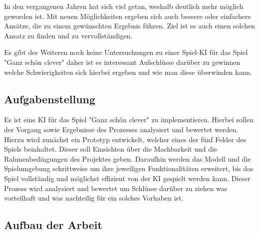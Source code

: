 In den vergangenen Jahren hat sich viel getan, weshalb deutlich mehr möglich geworden ist. Mit neuen Möglichkeiten ergeben sich auch bessere oder einfachere Ansätze, die zu einem gewünschten Ergebnis führen. Ziel ist es auch einen solchen Ansatz zu finden und zu vervollständigen.

Es gibt des Weiteren noch keine Untersuchungen zu einer Spiel-KI für das Spiel "Ganz schön clever" daher ist es interessant Aufschlüsse darüber zu gewinnen welche Schwierigkeiten sich hierbei ergeben und wie man diese überwinden kann.
\subsection{Aufgabenstellung}
Es ist eine KI für das Spiel "Ganz schön clever" zu implementieren. Hierbei sollen der Vorgang sowie Ergebnisse des Prozesses analysiert und bewertet werden. Hierzu wird zunächst ein Prototyp entwickelt, welcher eines der fünf Felder des Spiels beinhaltet. Dieser soll Einsichten über die Machbarkeit und die Rahmenbedingungen des Projektes geben. Daraufhin werden das Modell und die Spielumgebung schrittweise um ihre jeweiligen Funktionalitäten erweitert, bis das Spiel vollständig und möglichst effizient von der KI gespielt werden kann. Dieser Prozess wird analysiert und bewertet um Schlüsse darüber zu ziehen was vorteilhaft und was nachteilig für ein solches Vorhaben ist.
\subsection{Aufbau der Arbeit}